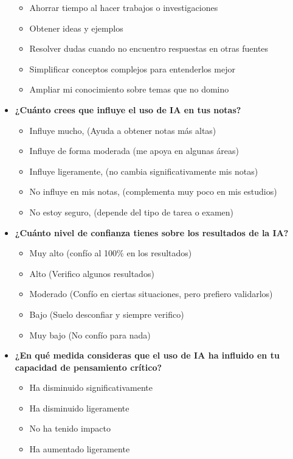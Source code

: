 \documentclass{article}
\newenvironment{recoleccionDeInformacion}{}{}
\begin{document}
\begin{recoleccionDeInformacion}
\begin{multicols}{2}
\begin{itemize}
\begin{itemize}
          \item Ahorrar tiempo al hacer trabajos o investigaciones
          \item Obtener ideas y ejemplos
          \item Resolver dudas cuando no encuentro respuestas en otras fuentes
          \item Simplificar conceptos complejos para entenderlos mejor
          \item Ampliar mi conocimiento sobre temas que no domino
      \end{itemize}
      \item \textbf{¿Cuánto crees que influye el uso de IA en tus notas?}
      \begin{itemize}
          \item Influye mucho, (Ayuda a obtener notas más altas)
          \item Influye de forma moderada (me apoya en algunas áreas)
          \item Influye ligeramente, (no cambia significativamente mis notas)
          \item No influye en mis notas, (complementa muy poco en mis estudios)
          \item No estoy seguro, (depende del tipo de tarea o examen)
      \end{itemize}
      \item \textbf{¿Cuánto nivel de confianza tienes sobre los resultados de la IA?}
      \begin{itemize}
        \item Muy alto (confío al 100\% en los resultados)
        \item Alto (Verifico algunos resultados)
        \item Moderado (Confío en ciertas situaciones, pero prefiero validarlos)
        \item Bajo (Suelo desconfiar y siempre verifico)
        \item Muy bajo (No confío para nada)
      \end{itemize}
      \item \textbf{¿En  qué  medida  consideras  que  el  uso  de  IA  ha  influido  en  tu  capacidad  de pensamiento  crítico?}
      \begin{itemize}
        \item Ha disminuido significativamente
        \item Ha disminuido ligeramente
        \item No ha tenido impacto
        \item Ha aumentado ligeramente

\end{itemize}
\end{itemize}
\end{multicols}
\end{recoleccionDeInformacion}
\end{document}
